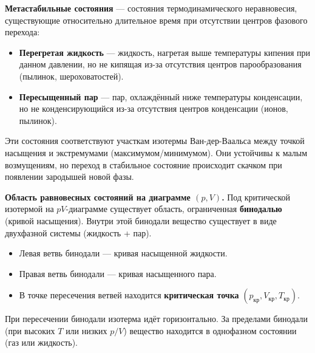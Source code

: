 \begin{definition}
\textbf{Метастабильные состояния} --- состояния термодинамического неравновесия, существующие относительно длительное время при отсутствии центров фазового перехода:
\begin{itemize}
    \item \textbf{Перегретая жидкость} --- жидкость, нагретая выше температуры кипения при данном давлении, но не кипящая из-за отсутствия центров парообразования (пылинок, шероховатостей).
    \item \textbf{Пересыщенный пар} --- пар, охлаждённый ниже температуры конденсации, но не конденсирующийся из-за отсутствия центров конденсации (ионов, пылинок).
\end{itemize}
Эти состояния соответствуют участкам изотермы Ван-дер-Ваальса между точкой насыщения и экстремумами (максимумом/минимумом). Они устойчивы к малым возмущениям, но переход в стабильное состояние происходит скачком при появлении зародышей новой фазы.
\end{definition}

\begin{remark}
\textbf{Область равновесных состояний на диаграмме $(p, V)$.}
Под критической изотермой на $pV$-диаграмме существует область, ограниченная \textbf{бинодалью} (кривой насыщения). Внутри этой бинодали вещество существует в виде двухфазной системы (жидкость + пар).
\begin{itemize}
    \item Левая ветвь бинодали --- кривая насыщенной жидкости.
    \item Правая ветвь бинодали --- кривая насыщенного пара.
    \item В точке пересечения ветвей находится \textbf{критическая точка} $(p_{\text{кр}}, V_{\text{кр}}, T_{\text{кр}})$.
\end{itemize}
При пересечении бинодали изотерма идёт горизонтально. За пределами бинодали (при высоких $T$ или низких $p/V$) вещество находится в однофазном состоянии (газ или жидкость).
\end{remark}
